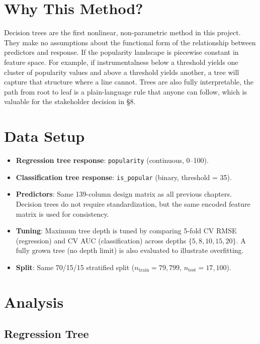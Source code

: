 \documentclass[12pt, oneside]{book}
\begin{document}
\section{Why This Method?}
 
Decision trees are the first nonlinear, non-parametric method in this project. They make no assumptions about the functional form of the relationship between predictors and response. If the popularity landscape is piecewise constant in feature space. For example, if instrumentalness below a threshold yields one cluster of popularity values and above a threshold yields another, a tree will capture that structure where a line cannot. Trees are also fully interpretable, the path from root to leaf is a plain-language rule that anyone can follow, which is valuable for the stakeholder decision in \S8.
 
\section{Data Setup}
 
\begin{itemize}
    \item \textbf{Regression tree response}: \texttt{popularity} (continuous, 0--100).
    \item \textbf{Classification tree response}: \texttt{is\_popular} (binary, threshold = 35).
    \item \textbf{Predictors}: Same 139-column design matrix as all previous chapters. Decision trees do not require standardization, but the same encoded feature matrix is used for consistency.
    \item \textbf{Tuning}: Maximum tree depth is tuned by comparing 5-fold CV RMSE (regression) and CV AUC (classification) across depths $\{5, 8, 10, 15, 20\}$. A fully grown tree (no depth limit) is also evaluated to illustrate overfitting.
    \item \textbf{Split}: Same 70/15/15 stratified split ($n_{\text{train}} = 79{,}799$, $n_{\text{test}} = 17{,}100$).
\end{itemize}
 
\section{Analysis}
 
\subsection{Regression Tree}
 
\end{document}
